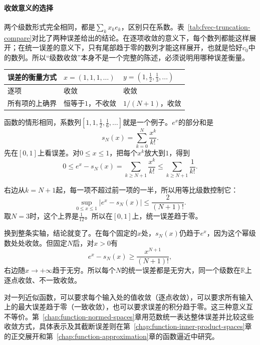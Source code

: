 \paragraph{收敛意义的选择}
两个级数形式完全相同，都是$\sum_kx_ke_k$，区别只在系数。表~\ref{tab:fvec-truncation-compare}对比了两种误差给出的结论。在逐项收敛的意义下，每个数列都能这样展开；在统一误差的意义下，只有尾部趋于零的数列才能这样展开，也就是恰好$c_0$中的数列。所以“级数收敛”本身不是一个完整的陈述，必须说明用哪种误差衡量。

\begin{BookInlineTable}
  \centering
  \begin{tabular}{@{}lll@{}}
    \toprule
    误差的衡量方式 & $x=(1,1,1,\ldots)$ & $y=(1,\tfrac12,\tfrac13,\ldots)$\\
    \midrule
    逐项 & 收敛 & 收敛\\
    所有项的上确界 & 恒等于$1$，不收敛 & $1/(N+1)$，收敛\\
    \bottomrule
  \end{tabular}
  \caption{同一种截断在两种误差下的结论。}
  \label{tab:fvec-truncation-compare}
\end{BookInlineTable}

函数的情形相同，系数列$[1,1,\tfrac12,\tfrac16,\ldots]$就是一个例子。$e^x$的部分和是
\[
 s_N(x)=\sum_{k=0}^N\frac{x^k}{k!}.
\]
先在$[0,1]$上看误差。对$0\leq x\leq1$，把每个$x^k$放大到$1$，得到
\[
 0\leq e^x-s_N(x)=\sum_{k\geq N+1}\frac{x^k}{k!}\leq\sum_{k\geq N+1}\frac1{k!}.
\]

右边从$k=N+1$起，每一项不超过前一项的一半，所以用等比级数控制它：
\begin{equation}
 \sup_{0\leq x\leq1}\lvert e^x-s_N(x)\rvert\leq\frac{2}{(N+1)!}.
 \label{eq:fvec-exp-truncation}
\end{equation}
取$N=3$时，这个上界是$\tfrac1{12}$。所以在$[0,1]$上，统一误差趋于零。

换到整条实轴，结论就变了。在每个固定的$x$处，$s_N(x)$仍趋于$e^x$，因为这个幂级数处处收敛。但固定$N$后，对$x>0$有
\[
 e^x-s_N(x)\geq\frac{x^{N+1}}{(N+1)!},
\]
右边随$x\to+\infty$趋于无穷。所以每个$N$的统一误差都是无穷大，同一个级数在$\mathbb R$上逐点收敛、不一致收敛。

对一列近似函数，可以要求每个输入处的值收敛（逐点收敛），可以要求所有输入上的最大误差趋于零（一致收敛），也可以要求误差的积分趋于零。这三种意义互不等价。第~\ref{chap:function-normed-spaces}章用范数统一表达整体误差并比较这些收敛方式，具体表示及其截断误差则在第~\ref{chap:function-inner-product-spaces}章的正交展开和第~\ref{chap:function-approximation}章的函数逼近中研究。
